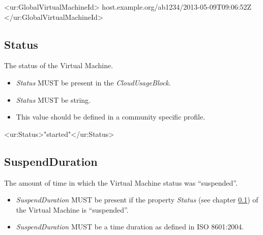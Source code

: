 \begin{XMLexample}
<ur:GlobalVirtualMachineId>
    host.example.org/ab1234/2013-05-09T09:06:52Z
</ur:GlobalVirtualMachineId>
\end{XMLexample}






\subsection{Status} \label{CloudStatus}

The status of the Virtual Machine.

\begin{itemize}
\item \emph{Status} MUST be present in the \emph{CloudUsageBlock}.
\item \emph{Status} MUST be string.
\item This value should be defined in a community specific profile.
\end{itemize}

\begin{XMLexample}
<ur:Status>"started"</ur:Status>
\end{XMLexample}






\subsection{SuspendDuration}

The amount of time in which the Virtual Machine status was  ``suspended''.

\begin{itemize}
\item \emph{SuspendDuration} MUST be present if the property \emph{Status} (see chapter \ref{CloudStatus}) of the Virtual Machine is ``suspended''.
\item \emph{SuspendDuration} MUST be a time duration as defined in ISO 8601:2004.

\end{itemize}

